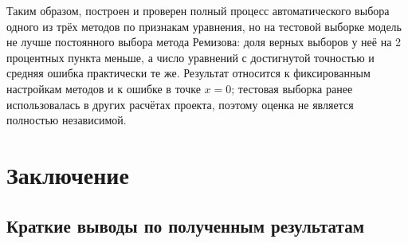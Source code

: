 \documentclass[14pt,a4paper]{extarticle}
\begin{document}
Таким образом, построен и проверен полный процесс автоматического выбора
одного из трёх методов по признакам уравнения, но на тестовой выборке
модель не лучше постоянного выбора метода Ремизова: доля верных выборов
у неё на 2 процентных пункта меньше, а число уравнений с достигнутой
точностью и средняя ошибка практически те же. Результат относится
к фиксированным настройкам методов и к ошибке в точке $x=0$; тестовая
выборка ранее использовалась в других расчётах проекта, поэтому оценка
не является полностью независимой.

\section{Заключение}
\subsection{Краткие выводы по полученным результатам}
\end{document}
